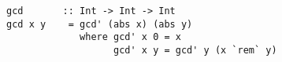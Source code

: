 \begin{verbatim}
gcd       :: Int -> Int -> Int
gcd x y    = gcd' (abs x) (abs y)
             where gcd' x 0 = x
                   gcd' x y = gcd' y (x `rem` y)
\end{verbatim}

